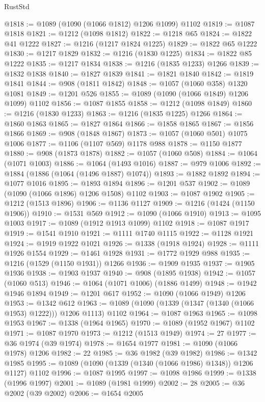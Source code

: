 \begin{lexlean}{RustStd}
\begin{coremodule}
@1818 := @1089 (@1090 (@1066 @1812) @1206 @1099) @1102
@1819 := @1087 @1818
@1821 := @1212 (@1098 @1812)
@1822 := @1218 @65
@1824 := @1822 @41 @1222
@1827 := @1216 (@1217 @1824 @1225)
@1829 := @1822 @65 @1222
@1830 := @1217 @1829
@1832 := @1216 (@1830 @1225)
@1834 := @1822 @85 @1222
@1835 := @1217 @1834
@1838 := @1216 (@1835 @1233) @1266
@1839 := @1832 @1838
@1840 := @1827 @1839
@1841 := @1821 @1840
@1842 := @1819 @1841
@1844 := @908 (@1811 @1842)
@1848 := @1057 (@1060 @358) @1320 @1081
@1849 := @1201 @526
@1855 := @1089 (@1090 (@1066 @1849) @1206 @1099) @1102
@1856 := @1087 @1855
@1858 := @1212 (@1098 @1849)
@1860 := @1216 (@1830 @1233)
@1863 := @1216 (@1835 @1225) @1266
@1864 := @1860 @1863
@1865 := @1827 @1864
@1866 := @1858 @1865
@1867 := @1856 @1866
@1869 := @908 (@1848 @1867)
@1873 := @1057 (@1060 @501) @1075 @1006
@1877 := @1106 (@1107 @569) @1178 @988
@1878 := @1150 @1877
@1880 := @908 (@1873 @1878)
@1882 := @1057 (@1060 @508)
@1884 := @1064 (@1071 @1003)
@1886 := @1064 (@1493 @1016)
@1887 := @979 @1006
@1892 := @1884 (@1886 (@1064 (@1496 @1887) @1074))
@1893 := @1882 @1892
@1894 := @1077 @1016
@1895 := @1893 @1894
@1896 := @1201 @537
@1902 := @1089 (@1090 (@1066 @1896) @1206 @1508) @1102
@1903 := @1087 @1902
@1905 := @1212 (@1513 @1896)
@1906 := @1136 @1127
@1909 := @1216 (@1424 (@1150 @1906))
@1910 := @1531 @569
@1912 := @1090 (@1066 @1910)
@1913 := @1095 @1003
@1917 := @1089 (@1912 @1913 @1099) @1102
@1918 := @1087 @1917
@1919 := @1541 @1910
@1921 := @1111 @1740 @1115
@1922 := @1128 @1921
@1924 := @1919 @1922 @1021
@1926 := @1338 (@1918 @1924)
@1928 := @1111 @1926 @1554
@1929 := @1461 @1928
@1931 := @1772 @1929 @988
@1935 := @1216 (@1529 (@1150 @1931)) @1266
@1936 := @1909 @1935
@1937 := @1905 @1936
@1938 := @1903 @1937
@1940 := @908 (@1895 @1938)
@1942 := @1057 (@1060 @513)
@1946 := @1064 (@1071 @1006) (@1886 @1499)
@1948 := @1942 @1946 @1894
@1949 := @1201 @617
@1952 := @1090 (@1066 @1949) @1206
@1953 := @1342 @612
@1963 := @1089 (@1090 (@1339 (@1347 (@1340 (@1066 @1953) @1222))) @1206 @1113) @1102
@1964 := @1087 @1963
@1965 := @1098 @1953
@1967 := @1338 (@1964 @1965)
@1970 := @1089 (@1952 @1967) @1102
@1971 := @1087 @1970
@1973 := @1212 (@1513 @1949)
@1974 := 27
@1977 := @36 @1974 (@39 @1974)
@1978 := @1654 @1977
@1981 := @1090 (@1066 @1978) @1206
@1982 := 22
@1985 := @36 @1982 (@39 @1982)
@1986 := @1342 @1985
@1995 := @1089 (@1090 (@1339 (@1340 (@1066 @1986) @1348)) @1206 @1127) @1102
@1996 := @1087 @1995
@1997 := @1098 @1986
@1999 := @1338 (@1996 @1997)
@2001 := @1089 (@1981 @1999)
@2002 := 28
@2005 := @36 @2002 (@39 @2002)
@2006 := @1654 @2005

\end{coremodule}
\end{lexlean}
